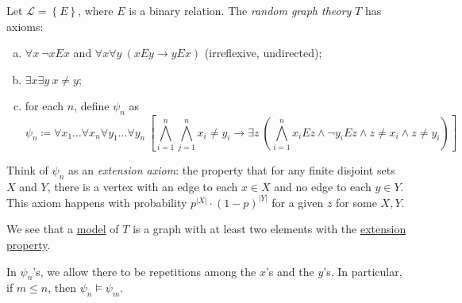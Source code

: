 \begin{definition}\label{def:random-graph-theory}
	Let \(\mathcal{L} = \left\{ E \right\} \), where \(E\) is a binary relation. The \emph{random graph theory} \(T\) has axioms:
	\begin{enumerate}[(a)]
		\item\label{def:random-graph-theory-a} \(\forall x\ \lnot xEx\) and \(\forall x \forall y\ (xEy \to yEx)\) (irreflexive, undirected);
		\item\label{def:random-graph-theory-b} \(\exists x \exists y\ x \neq y\);
		\item for each \(n\), define \(\psi _n\) as
		      \[
			      \psi _n \coloneqq \forall x_1 \dots \forall x_n \forall y_1 \dots \forall y_n\ \left[ \bigwedge_{i=1}^{n} \bigwedge_{j=1}^{n} x_i \neq y_i \to \exists z\ \left( \bigwedge_{i=1}^{n} x_i E z \land \lnot y_i E z \land z \neq x_i \land z \neq y_i \right) \right]
		      \]
	\end{enumerate}
\end{definition}

\begin{intuition}\label{int:extension-axiom}
	Think of \(\psi _n\) as an \emph{extension axiom}: the property that for any finite disjoint sets \(X\) and \(Y\), there is a vertex with an edge to each \(x\in X\) and no edge to each \(y\in Y\). This axiom happens with probability \(p^{\vert X \vert } \cdot (1 - p) ^{\vert Y \vert }\) for a given \(z\) for some \(X, Y\).
\end{intuition}

We see that a \hyperref[def:model]{model} of \(T\) is a graph with at least two elements with the \hyperref[int:extension-axiom]{extension property}.

\begin{center}
\end{center}

\begin{note}
	In \(\psi _n\)'s, we allow there to be repetitions among the \(x\)'s and the \(y\)'s. In particular, if \(m \leq n\), then \(\psi _n \models \psi _m\).
\end{note}